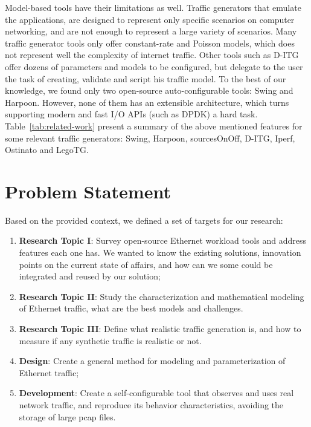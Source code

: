 Model-based tools have their limitations as well. Traffic generators that emulate the applications,  are designed to represent only specific scenarios on computer networking, and are not enough to represent a large variety of scenarios. Many  traffic generator tools only offer constant-rate and Poisson models, which does not represent well the complexity of internet traffic\cite{selfsimilar-ethernet}. Other tools such as D-ITG offer dozens of parameters and models to be configured, but delegate to the user the task of creating, validate and script his traffic model. To the best of our knowledge, we found only two open-source auto-configurable tools: Swing and Harpoon.  However, none of them has an extensible architecture, which turns supporting modern and fast \acrfull{I/O} \acrfull{API}s (such as DPDK\cite{web-dpdk}) a hard task. Table~\ref{tab:related-work} present a summary of the above mentioned features for some relevant traffic generators: Swing\cite{swing-paper}, Harpoon\cite{harpoon-validation}, sourcesOnOff\cite{sourcesonoff-paper}, D-ITG\cite{ditg-paper}, Iperf\cite{web-iperf}, Ostinato\cite{web-ostinato} and LegoTG\cite{legotg-paper}.


\section{Problem Statement}


Based on the provided context, we defined a set of targets for our research:


\begin{enumerate}

	\item \textbf{Research Topic I}:  Survey open-source Ethernet workload tools and address features each one has. We wanted to know the existing solutions, innovation points on the current state of affairs, and how can we some could be integrated and reused by our solution;
	
	\item \textbf{Research Topic II}: Study the characterization and mathematical modeling of Ethernet traffic, what are the best models and challenges. 
	
	\item \textbf{Research Topic III}: Define what realistic traffic generation is, and how to measure if any synthetic traffic is realistic or not. 
	
	\item \textbf{Design}: Create a general method for modeling and parameterization of Ethernet traffic;
	
	\item \textbf{Development}:  Create a self-configurable tool that observes and uses real network traffic, and reproduce its behavior characteristics, avoiding the storage of large pcap files. 
	
\end{enumerate}

